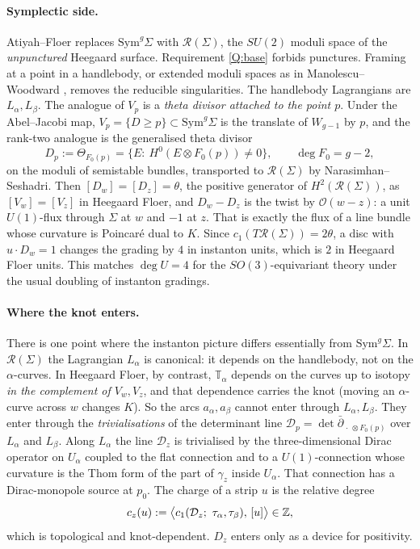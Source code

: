 \paragraph{Symplectic side.}
Atiyah--Floer replaces $\mathrm{Sym}^g\Sigma$ with $\mathcal R(\Sigma)$, the $SU(2)$ moduli space of the \emph{unpunctured} Heegaard surface.
Requirement \ref{Q:base} forbids punctures.  Framing at a point in a handlebody, or extended moduli spaces as in
Manolescu--Woodward \cite{MW}, removes the reducible singularities.  The handlebody Lagrangians are $L_\alpha,L_\beta$.  The
analogue of $V_p$ is a \emph{theta divisor attached to the point $p$}.  Under the Abel--Jacobi map,
$V_p=\{D\ge p\}\subset\mathrm{Sym}^g\Sigma$ is the translate of $W_{g-1}$ by $p$, and the rank-two analogue is the generalised
theta divisor
\[
D_p:=\Theta_{F_0(p)}=\{E:\ H^0(E\otimes F_0(p))\ne0\},\qquad \deg F_0=g-2,
\]
on the moduli of semistable bundles, transported to $\mathcal R(\Sigma)$ by Narasimhan--Seshadri.  Then $[D_w]=[D_z]=\theta$, the
positive generator of $H^2(\mathcal R(\Sigma))$, as $[V_w]=[V_z]$ in Heegaard Floer, and $D_w-D_z$ is the twist by
$\mathcal O(w-z)$: a unit $U(1)$-flux through $\Sigma$ at $w$ and $-1$ at $z$.  That is exactly the flux of a line bundle
whose curvature is Poincaré dual to $K$.  Since $c_1(T\mathcal R(\Sigma))=2\theta$, a disc with $u\cdot D_w=1$ changes the grading by $4$
in instanton units, which is $2$ in Heegaard Floer units.  This matches $\deg U=4$ for the $SO(3)$-equivariant
theory \cite{ME,DME} under the usual doubling of instanton gradings.

\paragraph{Where the knot enters.}
There is one point where the instanton picture differs essentially from $\mathrm{Sym}^g\Sigma$.  In $\mathcal R(\Sigma)$ the
Lagrangian $L_\alpha$ is canonical: it depends on the handlebody, not on the $\alpha$-curves.  In Heegaard Floer, by contrast,
$\mathbb T_\alpha$ depends on the curves up to isotopy \emph{in the complement of $V_w,V_z$}, and that dependence carries the
knot (moving an $\alpha$-curve across $w$ changes $K$).  So the arcs $a_\alpha,a_\beta$ cannot enter through $L_\alpha,L_\beta$.  They
enter through the \emph{trivialisations} of the determinant line $\mathcal D_p=\det\bar\partial_{\,\cdot\,\otimes F_0(p)}$ over $L_\alpha$ and $L_\beta$.
Along $L_\alpha$ the line $\mathcal D_z$ is trivialised by the three-dimensional Dirac operator on $U_\alpha$ coupled to the flat
connection and to a $U(1)$-connection whose curvature is the Thom form of the part of $\gamma_z$ inside $U_\alpha$.  That
connection has a Dirac-monopole source at $p_0$.  The charge of a strip $u$ is the relative degree
\[
c_z(u):=\big\langle c_1(\mathcal D_z;\ \tau_\alpha,\tau_\beta),\,[u]\big\rangle\in\Z,
\]
which is topological and knot-dependent.  $D_z$ enters only as a device for positivity.

